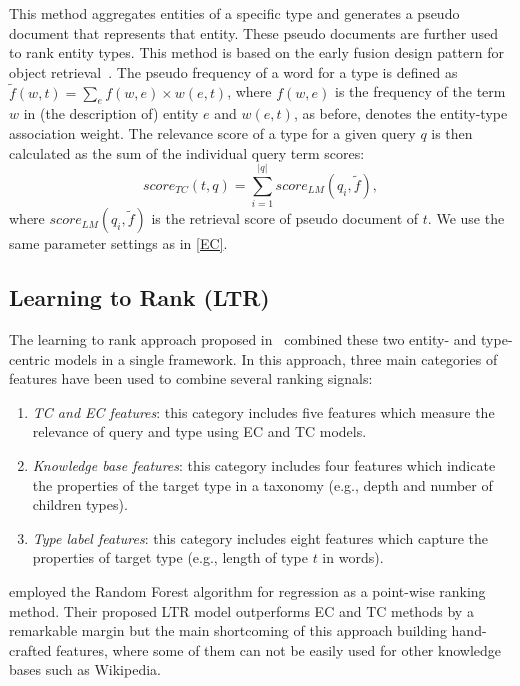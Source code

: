 This method aggregates entities of a specific type and generates a pseudo document that represents that entity. These pseudo documents are further used to rank entity types. This method is based on the early fusion design pattern for object retrieval~\cite{zhang2017design}. The pseudo frequency of a word for a type is defined as 
$\tilde{f}(w,t) = \sum_{e}{f(w,e)\times w(e,t)}$, where $f(w,e)$ is the frequency of the term $w$ in (the description of) entity $e$ and $w(e,t)$, as before, denotes the entity-type association weight. The relevance score of a type for a given query $q$ is then calculated as the sum of the individual query term scores:
\begin{equation}
score_{TC}(t,q) = \sum_{i=1}^{|q|}{score_{LM}(q_i,\tilde{f}),}
\end{equation}
where $score_{LM}(q_i,\tilde{f})$ is the retrieval score of pseudo document of $t$. We use the same parameter settings as in \ref{EC}.

\subsection{Learning to Rank (LTR)}
The learning to rank approach proposed in~\cite{Garigliotti:2017:TTI:3077136.3080659} combined these two entity- and type-centric models in a single framework. In this approach, three main categories of features have been used to combine several ranking signals:\begin{enumerate}
	\item \textit{TC and EC features}: this category includes five features which measure the relevance of query and type using EC and TC models.
	\item \textit{Knowledge base features}: this category includes four features which indicate the properties of the target type in a taxonomy (e.g., depth and number of children types).
	\item \textit{Type label features}: this category includes eight features which capture the properties of target type (e.g., length of type $t$ in words).
\end{enumerate}

\citet{Garigliotti:2017:TTI:3077136.3080659} employed the Random Forest algorithm for regression as a point-wise ranking method. Their proposed LTR model outperforms EC and TC methods by a remarkable margin but the main shortcoming of this approach building hand-crafted features, where some of them can not be easily used for other knowledge bases such as Wikipedia.
